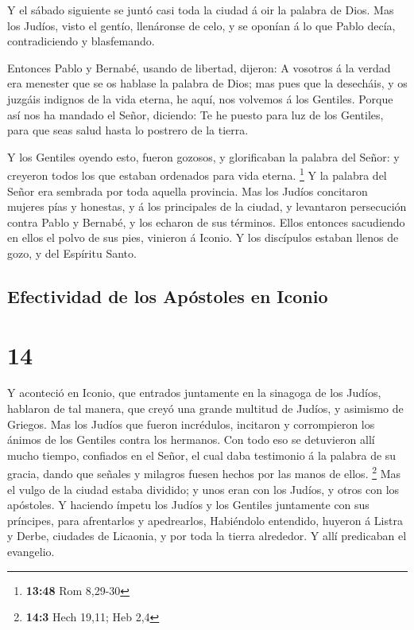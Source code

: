  Y el sábado siguiente se juntó casi toda la ciudad á oir
la palabra de Dios.  Mas los Judíos, visto el gentío,
llenáronse de celo, y se oponían á lo que Pablo decía, contradiciendo y
blasfemando.

 Entonces Pablo y Bernabé, usando de libertad, dijeron: A
vosotros á la verdad era menester que se os hablase la palabra de Dios;
mas pues que la desecháis, y os juzgáis indignos de la vida eterna, he
aquí, nos volvemos á los Gentiles.  Porque así nos ha
mandado el Señor, diciendo: Te he puesto para luz de los Gentiles, para
que seas salud hasta lo postrero de la tierra.

 Y los Gentiles oyendo esto, fueron gozosos, y glorificaban
la palabra del Señor: y creyeron todos los que estaban ordenados para
vida eterna. \footnote{\textbf{13:48} Rom 8,29-30}  Y la
palabra del Señor era sembrada por toda aquella provincia. 
Mas los Judíos concitaron mujeres pías y honestas, y á los principales
de la ciudad, y levantaron persecución contra Pablo y Bernabé, y los
echaron de sus términos.  Ellos entonces sacudiendo en
ellos el polvo de sus pies, vinieron á Iconio.  Y los
discípulos estaban llenos de gozo, y del Espíritu Santo.

\hypertarget{efectividad-de-los-apuxf3stoles-en-iconio}{%
\subsection{Efectividad de los Apóstoles en
Iconio}\label{efectividad-de-los-apuxf3stoles-en-iconio}}

\hypertarget{section-13}{%
\section{14}\label{section-13}}

 Y aconteció en Iconio, que entrados juntamente en la
sinagoga de los Judíos, hablaron de tal manera, que creyó una grande
multitud de Judíos, y asimismo de Griegos.  Mas los Judíos
que fueron incrédulos, incitaron y corrompieron los ánimos de los
Gentiles contra los hermanos.  Con todo eso se detuvieron
allí mucho tiempo, confiados en el Señor, el cual daba testimonio á la
palabra de su gracia, dando que señales y milagros fuesen hechos por las
manos de ellos. \footnote{\textbf{14:3} Hech 19,11; Heb 2,4}
 Mas el vulgo de la ciudad estaba dividido; y unos eran con
los Judíos, y otros con los apóstoles.  Y haciendo ímpetu
los Judíos y los Gentiles juntamente con sus príncipes, para afrentarlos
y apedrearlos,  Habiéndolo entendido, huyeron á Listra y
Derbe, ciudades de Licaonia, y por toda la tierra alrededor.
 Y allí predicaban el evangelio.

